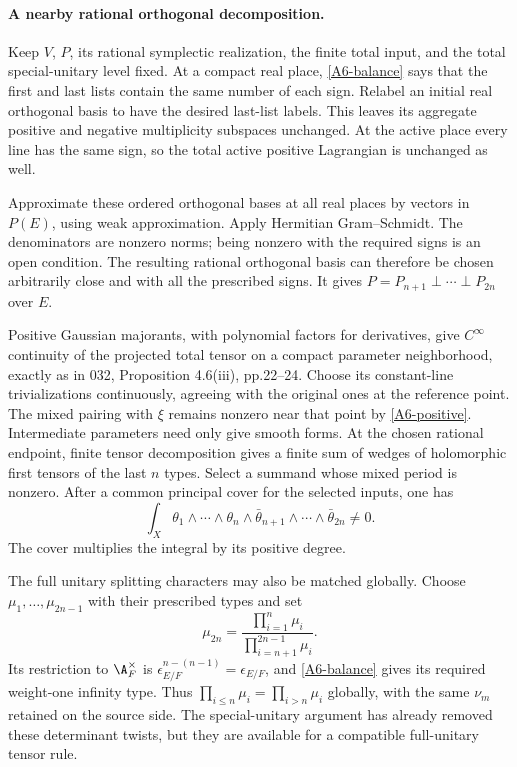 \paragraph{A nearby rational orthogonal decomposition.}
Keep $V$, $P$, its rational symplectic realization, the finite total
input, and the total special-unitary level fixed. At a compact real
place, \eqref{A6-balance} says that the first and last lists contain
the same number of each sign. Relabel an initial real orthogonal
basis to have the desired last-list labels. This leaves its aggregate
positive and negative multiplicity subspaces unchanged. At the
active place every line has the same sign, so the total active
positive Lagrangian is unchanged as well.

Approximate these ordered orthogonal bases at all real places by
vectors in $P(E)$, using weak approximation. Apply Hermitian
Gram--Schmidt. The denominators are nonzero norms; being nonzero
with the required signs is an open condition. The resulting
rational orthogonal basis can therefore be chosen arbitrarily close
and with all the prescribed signs. It gives
$P=P_{n+1}\perp\cdots\perp P_{2n}$ over $E$.

Positive Gaussian majorants, with polynomial factors for derivatives,
give $C^\infty$ continuity of the projected total tensor on a compact
parameter neighborhood, exactly as in 032, Proposition 4.6(iii),
pp.22--24. Choose its constant-line trivializations continuously,
agreeing with the original ones at the reference point. The mixed
pairing with $\xi$ remains nonzero near that point by
\eqref{A6-positive}. Intermediate parameters need only give smooth
forms. At the chosen rational endpoint, finite tensor decomposition
gives a finite sum of wedges of holomorphic first tensors of the last
$n$ types. Select a summand whose mixed period is nonzero. After
a common principal cover for the selected inputs, one has
\begin{equation}\label{A6-period}
 \int_X\theta_1\wedge\cdots\wedge\theta_n
       \wedge\bar\theta_{n+1}\wedge\cdots\wedge\bar\theta_{2n}
        \ne0.
\end{equation}
The cover multiplies the integral by its positive degree.

The full unitary splitting characters may also be matched globally.
Choose $\mu_1,\ldots,\mu_{2n-1}$ with their prescribed types and set
\[
 \mu_{2n}=\frac{\prod_{i=1}^n\mu_i}
                    {\prod_{i=n+1}^{2n-1}\mu_i}.
\]
Its restriction to $\A_F^\times$ is
$\epsilon_{E/F}^{n-(n-1)}=\epsilon_{E/F}$, and
\eqref{A6-balance} gives its required weight-one infinity type.
Thus $\prod_{i\leq n}\mu_i=\prod_{i>n}\mu_i$ globally, with the
same $\nu_m$ retained on the source side. The special-unitary
argument has already removed these determinant twists, but they
are available for a compatible full-unitary tensor rule.

